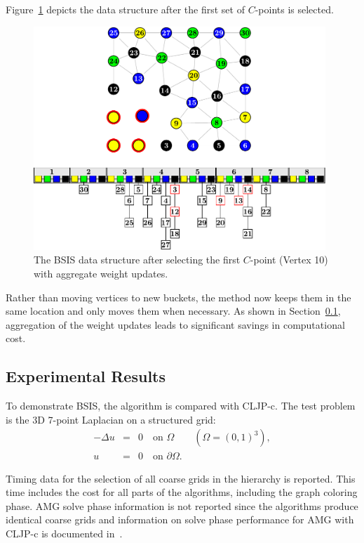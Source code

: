 \documentclass{elsart}
\begin{document}
Figure~\ref{5:fig:cp1-agg} depicts the data structure after the first
set of $C$-points is selected.
\begin{figure}
  \begin{center}
    \includegraphics[width=0.98\textwidth]{images/BSIS/cp1-agg}
    \caption{The BSIS data structure after selecting the first
    $C$-point (Vertex 10) with aggregate weight updates.}
    \label{5:fig:cp1-agg}
  \end{center}
\end{figure}
Rather than moving vertices to new buckets, the method now keeps them
in the same location and only moves them when necessary. As shown in
Section~\ref{5:sec:experiments}, aggregation of the weight updates
leads to significant savings in computational cost.

\subsection{Experimental Results}
\label{5:sec:experiments}
To demonstrate BSIS, the algorithm is compared with CLJP-c. The test
problem is the 3D 7-point Laplacian on a structured grid:
\begin{eqnarray}
\label{5:eqn:Lap} -\Delta u & = & 0 \quad \textrm{on } \Omega \qquad
(\Omega = (0, 1)^3),\\
\nonumber u & = & 0 \quad \textrm{on } \partial \Omega.
\end{eqnarray}

Timing data for the selection of all coarse grids in the hierarchy is
reported. This time includes the cost for all parts of the algorithms,
including the graph coloring phase. AMG solve phase information is not
reported since the algorithms produce identical coarse grids and
information on solve phase performance for AMG with CLJP-c is
documented in~\cite{alber-cljpc,alber-PCGS}.
\end{document}

